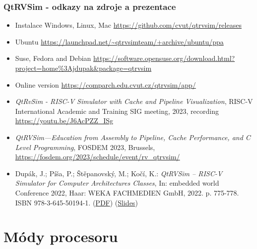 \documentclass[aspectratio=169]{beamer}
\begin{document}
\begin{frame}
\frametitle{QtRVSim - odkazy na zdroje a prezentace}
\begin{itemize}
\item Instalace Windows, Linux, Mac \url{https://github.com/cvut/qtrvsim/releases}
\item  Ubuntu \url{https://launchpad.net/~qtrvsimteam/+archive/ubuntu/ppa}
\item Suse, Fedora and Debian \url{https://software.opensuse.org/download.html?project=home\%3Ajdupak\&package=qtrvsim}
\item Online version \url{https://comparch.edu.cvut.cz/qtrvsim/app/}
\item \textit{QtRvSim - RISC-V Simulator with Cache and Pipeline Visualization}, RISC-V International Academic and Training SIG meeting, 2023, recording \url{https://youtu.be/J6AcPZZ_ISg}
\item \textit{QtRVSim—Education from Assembly to Pipeline, Cache Performance, and C Level Programming}, FOSDEM 2023, Brussels, \url{https://fosdem.org/2023/schedule/event/rv_qtrvsim/}
\item Dupák, J.; Píša, P.; Štěpanovský, M.; Kočí, K.: \textit{QtRVSim – RISC-V Simulator for Computer Architectures Classes}, In: embedded world Conference 2022, Haar: WEKA FACHMEDIEN GmbH, 2022. p. 775-778. ISBN 978-3-645-50194-1. (\href{https://comparch.edu.cvut.cz/publications/ewC2022-Dupak-Pisa-Stepanovsky-QtRvSim.pdf}{PDF}) (\href{https://comparch.edu.cvut.cz/slides/ewc22-qtrvsim.pdf}{Slides})

\end{itemize}
\end{frame}

\section{Módy procesoru}
\end{document}
